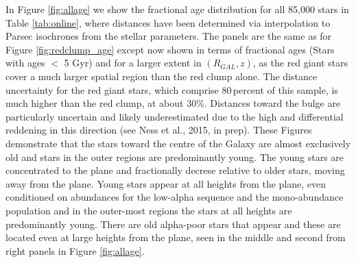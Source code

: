 \documentclass[12pt, preprint]{aastex}
\begin{document}
In Figure \ref{fig:allage} we show the fractional age distribution for all 85,000 stars in Table \ref{tab:online}, where distances have been determined via interpolation to Parsec isochrones from the stellar parameters. The panels are the same as for Figure \ref{fig:redclump_age} except now shown in terms of fractional ages (Stars with ages $<$ 5 Gyr) and for a larger extent in $(R_{GAL},z)$, as the red giant stars cover a much larger spatial region than the red clump alone. The distance uncertainty for the red giant stars, which comprise 80\,percent of this sample, is much higher than the red clump, at about 30\%. Distances toward the bulge are particularly uncertain and likely underestimated due to the high and differential reddening in this direction (see Ness et al., 2015, in prep).  These Figures demonstrate that the stars toward the centre of the Galaxy are almost exclusively old and stars in the outer regions are predominantly young. The young stars are concentrated to the plane and fractionally decrese relative to older stars, moving away from the plane. Young stars appear at all heights from the plane, even conditioned on abundances for the low-alpha sequence and the mono-abundance population and in the outer-most regions the stars at all heights are predominantly young. There are old alpha-poor stars that appear and these are located even at large heights from the plane, seen in the middle and second from right panels in Figure \ref{fig:allage}.
\end{document}
